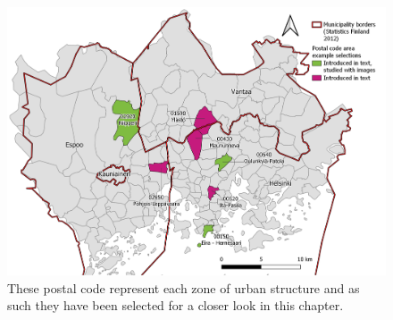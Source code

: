 \begin{figure}[H]%
    \centering
    \includegraphics[trim={0 0.2cm 0 0},clip,width=\textwidth]{images/results_comparison_examplezips.png}
    \caption[Postal code areas selected for in-depth results review]{These postal code represent each zone of urban structure and as such they have been selected for a closer look in this chapter.}%
    \label{fig:ykrzone_selections_map}%
\end{figure}

